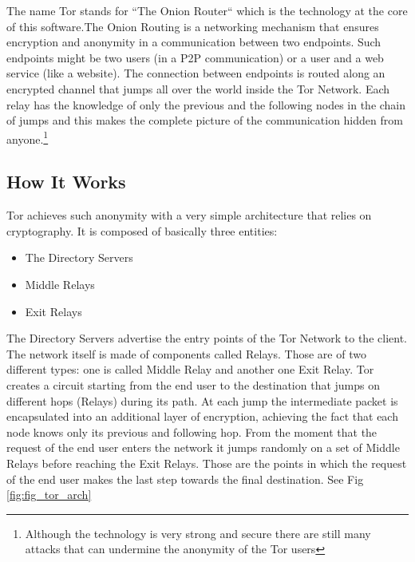 \documentclass[runningheads,a4paper]{llncs}
\begin{document}
The name Tor stands for ``The Onion Router`` 
which is the technology at the core of this software.The Onion Routing is a networking mechanism that ensures encryption and 
anonymity in a communication between two endpoints. Such endpoints might be two users (in a P2P communication) or a user and a web service (like a website). The connection between 
endpoints is routed along an encrypted channel that jumps all over the world inside the Tor Network. Each relay has the knowledge of only the previous and the 
following nodes in the chain of jumps and this makes the complete picture of the communication hidden from anyone.\footnote{Although the technology is very strong and secure there are still many attacks that can undermine the anonymity of the Tor users} \cite{CCDCOF}


\subsection{How It Works}
Tor achieves such anonymity with a very simple architecture that relies on cryptography.
It is composed of basically three entities: 
\begin{itemize}
    \setlength\itemsep{0.7em}
    \item The Directory Servers
    \item Middle Relays
    \item Exit Relays
\end{itemize}
The Directory Servers advertise the entry points of the Tor Network to the client.
The network itself is made of components called Relays. Those are of two different types: one is called Middle Relay and another one Exit Relay.
Tor creates a circuit starting from the end user to the destination that jumps on 
different hops (Relays) during its path. At each jump the intermediate packet is encapsulated into an additional layer of encryption, achieving the fact that each node knows only its previous and following hop. From the moment that the request of the end user 
enters the network it jumps randomly on a set of Middle Relays before reaching the Exit Relays. 
Those are the points in which the request of the end user makes the last step towards 
the final destination. See Fig \ref{fig:fig_tor_arch}
\end{document}
